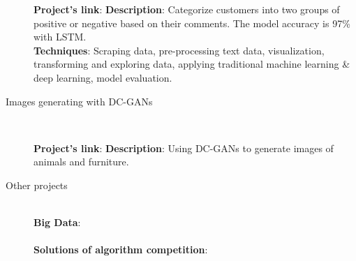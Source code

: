 \documentclass[a4paper,10pt]{article}
\begin{document}
\begin{adjustbox}{valign=t}
\begin{minipage}{0.6\textwidth}
\begin{description}
	\textbf{Project's link}: 
	\textbf{Description}: Categorize customers into two groups of positive or negative based on their comments. The model accuracy is 97\% with LSTM.\\

	\textbf{Techniques}: Scraping data, pre-processing text data, visualization, transforming and exploring data, applying traditional machine learning \& deep learning, model evaluation.\\
	
\item[\normalfont \textcolor{ColorOne}{Images generating with DC-GANs}] 
	\textbf{}\\ \medskip

	\textbf{Project's link}: 
	\textbf{Description}: Using DC-GANs to generate images of animals and furniture.\\

\item[\normalfont \textcolor{ColorOne}{Other projects}]
	\textbf{}\\ \medskip
	\textbf{Big Data}: \\\\
	\textbf{Solutions of algorithm competition}: \\

\end{description}

\LastUpdate
\end{minipage}
\end{adjustbox}
\end{document}

